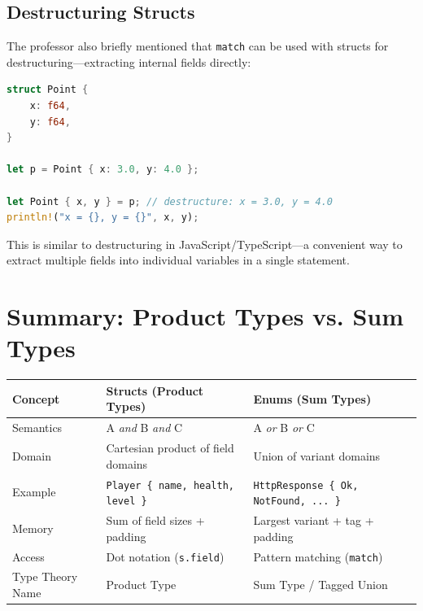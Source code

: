 \subsection{Destructuring Structs}

The professor also briefly mentioned that \texttt{match} can be used with structs for destructuring---extracting internal fields directly:

\begin{lstlisting}[language=Rust]
struct Point {
    x: f64,
    y: f64,
}

let p = Point { x: 3.0, y: 4.0 };

let Point { x, y } = p; // destructure: x = 3.0, y = 4.0
println!("x = {}, y = {}", x, y);
\end{lstlisting}

This is similar to destructuring in JavaScript/TypeScript---a convenient way to extract multiple fields into individual variables in a single statement.

\section{Summary: Product Types vs. Sum Types}

\begin{center}
\begin{tabular}{|l|l|l|}
\hline
\textbf{Concept} & \textbf{Structs (Product Types)} & \textbf{Enums (Sum Types)} \\
\hline
Semantics & A \textit{and} B \textit{and} C & A \textit{or} B \textit{or} C \\
\hline
Domain & Cartesian product of field domains & Union of variant domains \\
\hline
Example & \texttt{Player \{ name, health, level \}} & \texttt{HttpResponse \{ Ok, NotFound, ... \}} \\
\hline
Memory & Sum of field sizes + padding & Largest variant + tag + padding \\
\hline
Access & Dot notation (\texttt{s.field}) & Pattern matching (\texttt{match}) \\
\hline
Type Theory Name & Product Type & Sum Type / Tagged Union \\
\hline
\end{tabular}
\end{center}

